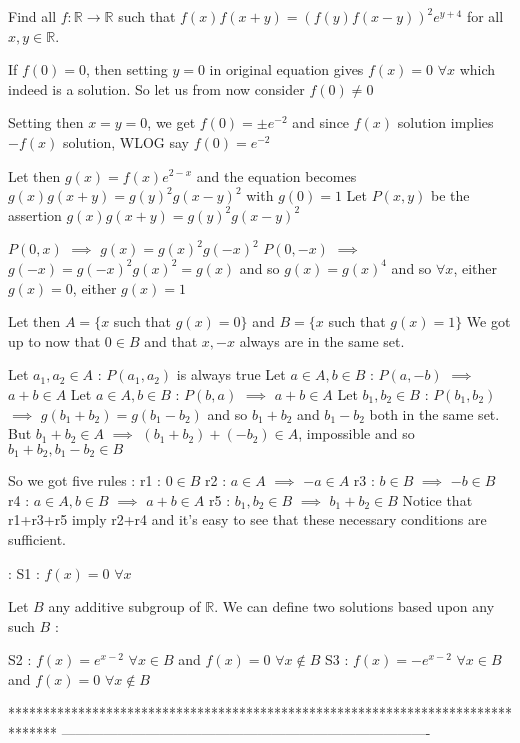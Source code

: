 \begin{solution}
	\begin{tcolorbox}Find all $f:\mathbb{R} \to \mathbb{R}$ such that $f(x)f(x+y)=(f(y)f(x-y))^2 e^{y+4}$ for all $x,y\in \mathbb{R}$.\end{tcolorbox}
If $f(0)=0$, then setting $y=0$ in original equation gives $f(x)=0$ $\forall x$ which indeed is a solution.
So let us from now consider $f(0)\ne 0$

Setting then $x=y=0$, we get $f(0)=\pm e^{-2}$ and since $f(x)$ solution implies $-f(x)$ solution, WLOG say $f(0)=e^{-2}$

Let then $g(x)=f(x)e^{2-x}$ and the equation becomes $g(x)g(x+y)=g(y)^2g(x-y)^2$ with $g(0)=1$
Let $P(x,y)$ be the assertion $g(x)g(x+y)=g(y)^2g(x-y)^2$

$P(0,x)$ $\implies$ $g(x)=g(x)^2g(-x)^2$
$P(0,-x)$ $\implies$ $g(-x)=g(-x)^2g(x)^2=g(x)$ and so $g(x)=g(x)^4$ and so $\forall x$, either $g(x)=0$, either $g(x)=1$

Let then $A=\{x$ such that $g(x)=0\}$ and $B=\{x$ such that $g(x)=1\}$
We got up to now that $0\in B$ and that $x,-x$ always are in the same set.

Let $a_1,a_2\in A$ : $P(a_1,a_2)$ is always true
Let $a\in A,b\in B$ : $P(a,-b)$ $\implies$ $a+b\in A$
Let $a\in A,b\in B$ : $P(b,a)$ $\implies$ $a+b\in A$
Let $b_1,b_2\in B$ : $P(b_1,b_2)$ $\implies$ $g(b_1+b_2)=g(b_1-b_2)$ and so $b_1+b_2$ and $b_1-b_2$ both in the same set.
But $b_1+b_2\in A$ $\implies$ $(b_1+b_2)+(-b_2)\in A$, impossible and so $b_1+b_2,b_1-b_2\in B$

So we got five rules :
r1 : $0\in B$
r2 : $a\in A$ $\implies$ $-a\in A$
r3 : $b\in B$ $\implies$ $-b\in B$
r4 : $a\in A,b\in B$ $\implies$ $a+b\in A$
r5 : $b_1,b_2\in B$ $\implies$ $b_1+b_2\in B$
Notice that r1+r3+r5 imply r2+r4 and it's easy to see that these necessary conditions are sufficient.

 :
S1 : $f(x)=0$ $\forall x$

Let $B$ any additive subgroup of $\mathbb R$. We can define two solutions based upon any such $B$ :

S2 : $f(x)=e^{x-2}$ $\forall x\in B$ and $f(x)=0$ $\forall x\notin B$
S3 : $f(x)=-e^{x-2}$ $\forall x\in B$ and $f(x)=0$ $\forall x\notin B$
\end{solution}
*******************************************************************************
-------------------------------------------------------------------------------


